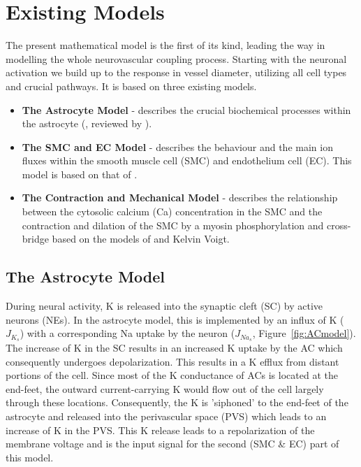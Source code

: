\section{Existing Models}

The present mathematical model is the first of its kind, leading the way in modelling the whole neurovascular coupling process. Starting with the neuronal activation we build up to the response in vessel diameter, utilizing all cell types and crucial pathways.  It is based on three existing models. 

\begin{itemize}
\item \textbf{The Astrocyte Model} - describes the crucial biochemical processes within the astrocyte (\citet{Ostby2009}, reviewed  by \citet{LoesEvert}). 
\item  \textbf{The SMC and EC Model} - describes the behaviour and the main ion fluxes within the smooth muscle cell (SMC) and endothelium cell (EC). This model is based on that of \citet{Koenigsberger2006}. 
\item \textbf{The Contraction and Mechanical Model} -  describes the relationship between the cytosolic calcium (\gls{Ca}) concentration in the SMC and the contraction and dilation of the SMC by a myosin phosphorylation and cross-bridge based on the models of \citet{Hai1989} and Kelvin Voigt. \\
\end{itemize}

\subsection{The Astrocyte Model}
During neural activity, \gls{K} is released into the synaptic cleft (SC) by active neurons (NEs). In the astrocyte model, this is implemented by an influx of \gls{K} ($J_{K_s}$) with a corresponding \gls{Na} uptake by the neuron ($ J_{Na_s} $, Figure~\ref{fig:ACmodel}).
The increase of \gls{K} in the SC results in an increased \gls{K} uptake by the \gls{AC} which consequently undergoes depolarization. This results in a \gls{K} efflux from distant portions of the cell. Since most of the \gls{K} conductance of \gls{AC}s is located at the end-feet, the outward current-carrying \gls{K} would flow out of the cell largely through these locations. Consequently, the \gls{K} is 'siphoned' to the end-feet of the astrocyte and released into the perivascular space (\gls{PVS}) which leads to an increase of \gls{K} in the PVS. This \gls{K} release leads to a repolarization of the membrane voltage and is the input signal for the second (SMC \& EC) part of this model. \\

